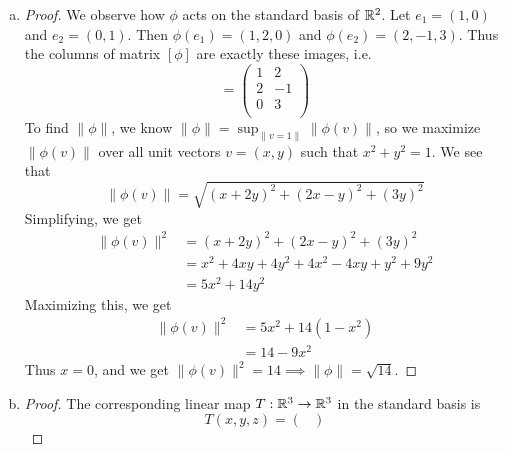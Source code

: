 \documentclass[11pt]{article}
\begin{document}
\begin{exercise}{2}
    \begin{enumerate} [(a)]
        \item \begin{proof}
            We observe how $\phi$ acts on the standard basis of $\mathbb{R}^2$. Let $e_1 = (1, 0)$ and $e_2 = (0, 1)$. Then $\phi(e_1) = (1, 2, 0)$ and $\phi(e_2) = (2, -1, 3)$. Thus the columns of matrix $[\phi]$ are exactly these images, i.e. \begin{equation*}
            [\phi] = 
            \begin{pmatrix}
                1 & 2 \\
                2 & -1 \\
                0 & 3 \\
            \end{pmatrix}
        \end{equation*}
        To find $\| \phi \| $, we know $\| \phi \| = \sup_{\| v = 1 \|} \| \phi(v) \|$, so we maximize $\| \phi(v) \| $ over all unit vectors $v = (x, y)$ such that $x^2 + y^2 = 1$. We see that $$\| \phi(v) \| = \sqrt{(x + 2y)^2 + (2x - y)^2 + (3y)^2}$$ Simplifying, we get \begin{equation*}
            \begin{split}
                \| \phi(v) \|^2 & = (x + 2y)^2 + (2x - y)^2 + (3y)^2 \\
                & = x^2 + 4xy + 4y^2 + 4x^2 - 4xy + y^2 + 9y^2 \\
                & = 5x^2 + 14y^2
            \end{split}
        \end{equation*}
        Maximizing this, we get \begin{equation*}
            \begin{split}
                \| \phi(v) \|^2 & = 5x^2 + 14(1 - x^2) \\ 
                & = 14 - 9x^2
            \end{split}
        \end{equation*}
        Thus $x = 0$, and we get $\| \phi(v) \|^2 = 14 \implies \| \phi \| = \sqrt{14}$. 
        \end{proof}
        \item \begin{proof} The corresponding linear map $T: \mathbb{R}^3 \to \mathbb{R}^3$ in the standard basis is
            \begin{equation*}
                T(x, y, z) = \begin{pmatrix}

\end{pmatrix}
\end{equation*}
\end{proof}
\end{enumerate}
\end{exercise}
\end{document}
